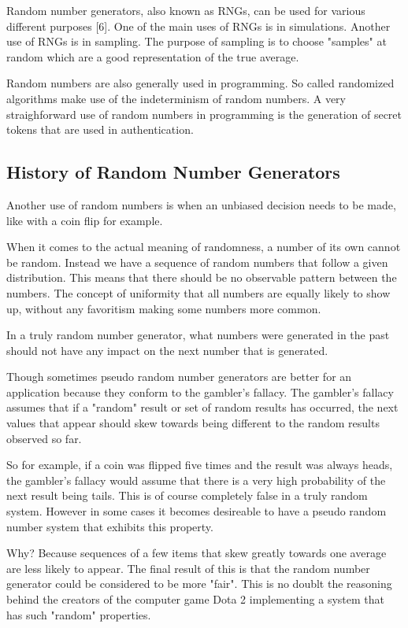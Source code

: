 \documentclass{article}
\begin{document}
    Random number generators, also known as RNGs, can be used for various different purposes [6].
    One of the main uses of RNGs is in simulations.
    Another use of RNGs is in sampling. The purpose of sampling is to choose
    "samples" at random which are a good representation of the true average.

    Random numbers are also generally used in programming. So called randomized algorithms
    make use of the indeterminism of random numbers.
    A very straighforward use of random numbers in programming
    is the generation of secret tokens that are used in authentication.
        
    \subsection{History of Random Number Generators}

    Another use of random numbers is when an unbiased decision needs to be made,
    like with a coin flip for example.

    When it comes to the actual meaning of randomness, a number of its own cannot be random.
    Instead we have a sequence of random numbers that follow a given distribution.
    This means that there should be no observable pattern between the numbers.
    The concept of uniformity that all numbers are equally likely to show up, without
    any favoritism making some numbers more common.
    
    In a truly random number generator, what numbers were generated in the past
    should not have any impact on the next number that is generated.

    Though sometimes pseudo random number generators are better for an application
    because they conform to the gambler's fallacy.
    The gambler's fallacy assumes that if a "random" result or set of random
    results has occurred, the next values that appear should skew towards being
    different to the random results observed so far.

    So for example, if a coin was flipped five times and the result was always heads,
    the gambler's fallacy would assume that there is a very high probability
    of the next result being tails. This is of course completely false in
    a truly random system.
    However in some cases it becomes desireable to have a pseudo random number system
    that exhibits this property.

    Why? Because sequences of a few items that skew greatly towards one average
    are less likely to appear.
    The final result of this is that the random number generator could be considered
    to be more "fair".
    This is no doublt the reasoning behind the creators of the computer game Dota 2
    implementing a system that has such "random" properties.
\end{document}

